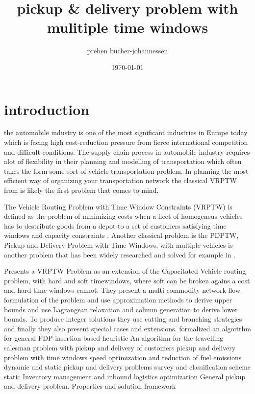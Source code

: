 \documentclass[a4paper,10pt]{article}
\begin{document}
\title{pickup \& delivery problem with mulitiple time windows}
\author{preben bucher-johannessen}
\date{\today}
\maketitle

\tableofcontents
\newpage
{}

\section*{introduction}
the automobile industry is one of the most significant industries in Europe today which is facing high cost-reduction pressure from fierce international competition and difficult conditions.\cite{4flowWeb}
The supply chain process in automobile industry requires alot of flexibility in their planning and modelling of transportation which often takes the form some sort of vehicle transportation problem.
In planning the most efficient way of organizing your transportation network the classical VRPTW from is likely the first problem that comes to mind.

\cite{parragh08}
The Vehicle Routing Problem with Time Window Constraints (VRPTW) is defined as the problem of minimizing costs when a fleet of homogeneus vehicles has to destribute goods from a depot to a set of customers satisfying time windows and capacity constraints \cite{cordeau00}. 
Another classical problem is the PDPTW, Pickup and Delivery Problem with Time Windows, with multiple vehicles is another problem that has been widely researched and solved for example in \cite{nanry00}. 
\par

\cite{cordeau00} Presents a VRPTW Problem as an extension of the Capacitated Vehicle routing problem, with hard and soft timewindows, where soft can be broken agains a cost and hard time-windows cannot.
They present a multi-commodity network flow formulation of the problem and use approximation methods to derive upper bounds and use Lagrangean relaxation and column generation to derive lower bounds. 
To produce integer solutions they use cutting and branching strategies and finally they also present special cases and extensions. 
\cite{solomon87} formalized an algorithm for general PDP
\cite{lu06} insertion based heuristic
\cite{kalantari85} An algorithm for the travelling salesman problem with pickup and delivery of customers
\cite{dumas91} pickup and delivery problem with time windows
\cite{fagerholt10} speed optimization and reduction of fuel emissions
\cite{berbeglia10} dynamic and static pickup and delivery problems survey and classification scheme 
\cite{berbeglia07} static
\cite{zhou13} Inventory management and inbound logistics optimization
\cite{savelsbergh95} General pickup and delivery problem.
\cite{dror89} Properties and solution framework
\end{document}

